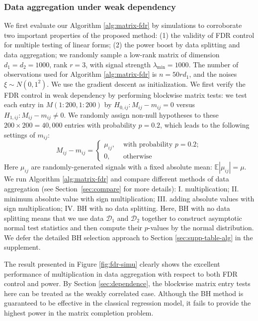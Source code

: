 \documentclass[12pt]{article}
\newcommand{\abs}[1]{\left\lvert#1\right\rvert}
\newcommand{\E}{\mathbb{E}}
\newcommand{\cD}{\mathcal{D}}
\theoremstyle{plain}
\begin{document}
\begin{sloppypar}
\subsubsection{Data aggregation under weak dependency}\label{sec:weak-simu}
We first evaluate our Algorithm \ref{alg:matrix-fdr} by simulations to corroborate two important properties of the proposed method: (1) the validity of FDR control for multiple testing of linear forms; (2) the power boost by data splitting and data aggregation; we randomly sample a low-rank matrix of dimension $d_1=d_2=1000$, rank $r=3$, with signal strength $\lambda_{\min}=1000$. The number of observations used for Algorithm \ref{alg:matrix-fdr} is $n=50rd_1$, and the noises $\xi\sim N(0,1^2)$. We use the gradient descent \citep{wei2016guarantees,chen2020noisy,cai2022generalized} as initialization. We first verify the FDR control in weak dependency by performing blockwise matrix tests: we test each entry in $M(1:200,1:200)$ by $H_{0,ij}: M_{ij}-m_{ij}=0$ versus $H_{1,ij}: M_{ij}-m_{ij}\neq 0$. We randomly assign non-null hypotheses to these $200\times 200=40,000$ entries with probability $p=0.2$, which leads to the following settings of $m_{ij}$:
\begin{equation}\label{eq:construct_H0}
    M_{ij}-m_{ij}=\begin{cases}
        \mu_{ij}, & \text{ with probability } p=0.2 ;\\
         0, & \text{ otherwise }
    \end{cases}  
\end{equation}
Here $\mu_{ij}$ are randomly-generated signals with a fixed absolute mean: $\E \abs{\mu_{ij}}=\mu$. We run Algorithm \ref{alg:matrix-fdr} and compare different methods of data aggregation (see Section~\ref{sec:compare} for more details): I. multiplication; II. minimum absolute value with sign multiplication; III. adding absolute values with sign multiplication; IV. BH with no data splitting. Here, BH with no data splitting means that we use data $\cD_1$ and $\cD_2$ together to construct asymptotic normal test statistics and then compute their $p$-values by the normal distribution. We defer the detailed BH selection approach to Section \ref{sec:supp-table-alg} in the supplement.


The result presented in Figure \ref{fig:fdr-simu} clearly shows the excellent performance of multiplication in data aggregation with respect to both FDR control and power. By Section \ref{sec:dependence}, the blockwise matrix entry tests here can be treated as the weakly correlated case. Although the BH method \cite{benjamini1995controlling} is guaranteed to be effective in the classical regression model, it fails to provide the highest power in the matrix completion problem. 


\end{sloppypar}
\end{document}
